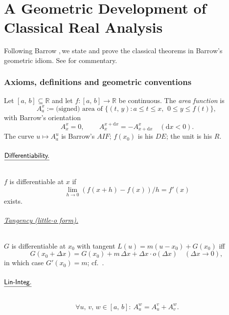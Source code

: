 \documentclass[11pt,reqno]{amsart}
\providecommand{\R}{\mathbb{R}}
\newcommand{\comma}{,\,\allowbreak}
\theoremstyle{redplain}
\begin{document}
\part{A Geometric Development of Classical Real Analysis}
\label{part:part1}
\noindent Following Barrow \cite[Lecture~X, \S 11]{Barrow1916}\comma we state and prove the classical theorems in Barrow's geometric idiom. See \cite{Lopez2026} for commentary.

\section{Axioms, definitions and geometric conventions}
\label{sec:conventions}

Let $[a\comma b]\subseteq\R$ and let $f\colon[a\comma b]\to\R$ be continuous. The \emph{area function} is
\begin{equation}\label{eq:area}
A_a^x:=\text{(signed) area of }\{(t\comma y): a\le t\le x\comma\ 0\le y\le f(t)\}\comma
\end{equation}
with Barrow's orientation
\begin{equation}\label{eq:oriented-area}
A_x^{x}=0\comma\qquad A_x^{x+\mathrm{d}x}=-A_{x+\mathrm{d}x}^{x}\quad(\mathrm{d}x<0).
\end{equation}
The curve $u\mapsto A_a^u$ is Barrow's $AIF$; $f(x_0)$ is his $DE$; the unit is his $R$.

\paragraph{$\textsf{\underline{Differentiability.}}$}\text{\ } $f$ is differentiable at $x$ if
\begin{equation}\label{eq:diff}
\lim_{h\to 0}(f(x+h)-f(x))/h=f'(x)
\end{equation}
exists.

\paragraph{\textsf{\underline{Tangency (little-\textit{o} form).}}}
$G$ is differentiable at $x_0$ with tangent $L(u)=m(u-x_0)+G(x_0)$ iff
\begin{equation}\label{eq:little-o}
G(x_0+\Delta x)=G(x_0)+m\,\Delta x+\Delta x\cdot o(\Delta x)\quad(\Delta x\to0)\comma
\end{equation}
in which case $G'(x_0)=m$; cf.\ \cite[Theorem~2]{Lopez2026}.

\paragraph{$\textsf{\underline{Lin-Integ.}}$}\text{\ }
\begin{equation}\label{eq:lin-int}
\forall u\comma v\comma w\in[a\comma b]:\ A_u^w=A_u^v+A_v^w.
\end{equation}
\end{document}
